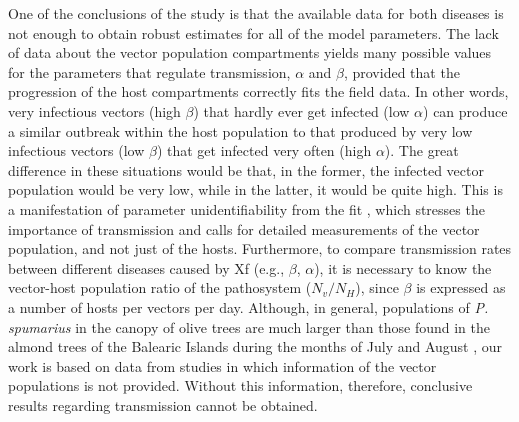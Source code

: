 One of the conclusions of the study is that the available data for both
diseases is not enough to obtain robust estimates for all of the model
parameters. The lack of data about the vector population compartments yields
many possible values for the parameters that regulate transmission, $\alpha$
and $\beta$, provided that the progression of the host compartments correctly
fits the field data. In other words, very infectious vectors (high $\beta$)
that hardly ever get infected (low $\alpha$) can produce a similar outbreak
within the host population to that produced by very low infectious vectors (low
$\beta$) that get infected very often (high $\alpha$). The great difference in
these situations would be that, in the former, the infected vector population
would be very low, while in the latter, it would be quite high. This is a
manifestation of parameter unidentifiability from the fit
\cite{Chowel2017,Roosa2019}, which stresses the importance of transmission
and calls for detailed measurements of the vector population, and not just of
the hosts. Furthermore, to compare transmission rates between different
diseases caused by Xf (e.g., $\beta$, $\alpha$), it is necessary to know the
vector-host population ratio of the pathosystem ($N_v/N_H$), since $\beta$ is
expressed as a number of hosts per vectors per day. Although, in general,
populations of \textit{P. spumarius} in the canopy of olive trees are much
larger than those found in the almond trees of the Balearic Islands during the
months of July and August \cite{Lopez2021},
our work is based on data from studies in which information of the vector
populations is not provided. Without this information, therefore, conclusive
results regarding transmission cannot be obtained.

